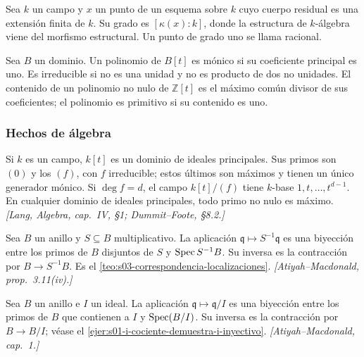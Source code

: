 \begin{defi}
\label{defi:s08-grado-punto}
Sea $k$ un campo y $x$ un punto de un esquema sobre $k$ cuyo cuerpo residual es una extensión finita de $k$. Su grado es $[\kappa(x):k]$, donde la estructura de $k$-álgebra viene del morfismo estructural. Un punto de grado uno se llama racional.
\end{defi}

\begin{defi}
\label{defi:s08-polinomios-primitivos}
Sea $B$ un dominio. Un polinomio de $B[t]$ es mónico si su coeficiente principal es uno. Es irreducible si no es una unidad y no es producto de dos no unidades. El contenido de un polinomio no nulo de $\mathbb Z[t]$ es el máximo común divisor de sus coeficientes; el polinomio es primitivo si su contenido es uno.
\end{defi}

\subsubsection{Hechos de álgebra}

\begin{prop}
\label{prop:s08-polinomios-campo}
Si $k$ es un campo, $k[t]$ es un dominio de ideales principales. Sus primos son $(0)$ y los $(f)$, con $f$ irreducible; estos últimos son máximos y tienen un único generador mónico. Si $\deg f=d$, el campo $k[t]/(f)$ tiene $k$-base $1,t,\ldots,t^{d-1}$. En cualquier dominio de ideales principales, todo primo no nulo es máximo. \emph{[Lang, Algebra, cap.~IV, \S1; Dummit--Foote, \S8.2.]}
\end{prop}

\begin{prop}
\label{prop:s08-primos-localizacion}
Sea $B$ un anillo y $S\subseteq B$ multiplicativo. La aplicación $\mathfrak q\mapsto S^{-1}\mathfrak q$ es una biyección entre los primos de $B$ disjuntos de $S$ y $\operatorname{Spec} S^{-1}B$. Su inversa es la contracción por $B\to S^{-1}B$. Es el \cref{teo:s03-correspondencia-localizaciones}. \emph{[Atiyah--Macdonald, prop.~3.11(iv).]}
\end{prop}

\begin{prop}
\label{prop:s08-primos-cociente}
Sea $B$ un anillo e $I$ un ideal. La aplicación $\mathfrak q\mapsto\mathfrak q/I$ es una biyección entre los primos de $B$ que contienen a $I$ y $\operatorname{Spec}(B/I)$. Su inversa es la contracción por $B\to B/I$; véase el \cref{ejer:s01-i-cociente-demuestra-i-inyectivo}. \emph{[Atiyah--Macdonald, cap.~1.]}
\end{prop}

